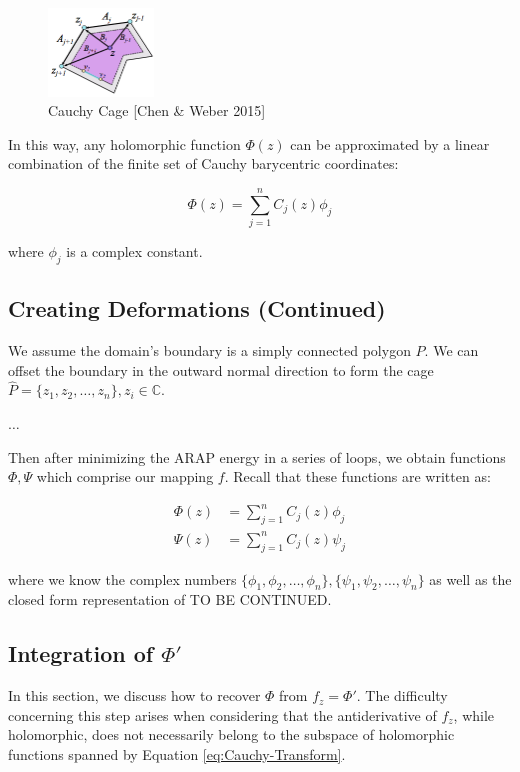 \begin{figure}[h]
	\centering
	\includegraphics[width=0.25\textwidth]{Images/Cauchy-Cage.png}
	\caption{Cauchy Cage [Chen \& Weber 2015]}
	\label{fig:Cauchy-Cage}
\end{figure}

In this way, any holomorphic function $\Phi(z)$ can be approximated by a linear combination of the finite set of Cauchy barycentric coordinates:

$$\Phi(z) = \sum_{j=1}^n C_j(z) \phi_j$$

where $\phi_j$ is a complex constant.

\subsection{Creating Deformations (Continued)}

We assume the domain's boundary is a simply connected polygon $P$. We can offset the boundary in the outward normal direction to form the cage $\hat{P} = \{z_1, z_2, \ldots, z_n\}, z_i \in \mathbb{C}$. 

$\ldots$

Then after minimizing the ARAP energy in a series of loops, we obtain functions $\Phi, \Psi$ which comprise our mapping $f$. Recall that these functions are written as:

\begin{align} \label{eq:Cauchy-Transform}
\Phi(z) &= \sum_{j=1}^n C_j(z) \phi_j \\
\Psi(z) &= \sum_{j=1}^n C_j(z) \psi_j
\end{align}

where we know the complex numbers $\{\phi_1, \phi_2, \ldots, \phi_n\}, \{\psi_1, \psi_2, \ldots, \psi_n\}$ as well as the closed form representation of TO BE CONTINUED.


\subsection{Integration of $\Phi'$}

In this section, we discuss how to recover $\Phi$ from $f_z = \Phi'$. The difficulty concerning this step arises when considering that the antiderivative of $f_z$, while holomorphic, does not necessarily belong to the subspace of holomorphic functions spanned by Equation \ref{eq:Cauchy-Transform}. 

